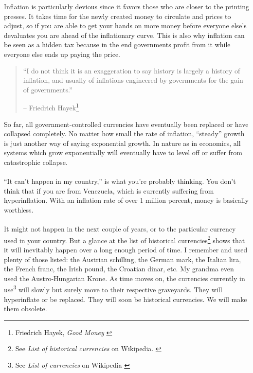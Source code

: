 Inflation is particularly devious since it favors those who are closer
to the printing presses. It takes time for the newly created money to
circulate and prices to adjust, so if you are able to get your hands on
more money before everyone else's devaluates you are ahead of the
inflationary curve. This is also why inflation can be seen as a hidden
tax because in the end governments profit from it while everyone else
ends up paying the price.

\begin{quotation}\begin{samepage}
\enquote{I do not think it is an exaggeration to say history is largely a
history of inflation, and usually of inflations engineered by
governments for the gain of governments.}
\begin{flushright} -- Friedrich Hayek\footnote{Friedrich Hayek, \textit{Good Money} \cite{hayek-good-money}}
\end{flushright}\end{samepage}\end{quotation}

\newpage

So far, all government-controlled currencies have eventually been
replaced or have collapsed completely. No matter how small the rate of
inflation, \enquote{steady} growth is just another way of saying exponential
growth. In nature as in economics, all systems which grow exponentially
will eventually have to level off or suffer from catastrophic collapse.

\paragraph{}
\enquote{It can't happen in my country,} is what you're probably thinking. You don't
think that if you are from Venezuela, which is currently suffering from
hyperinflation. With an inflation rate of over 1 million percent, money is
basically worthless. \cite{wiki:venezuela}

\paragraph{}
It might not happen in the next couple of years, or to the particular currency
used in your country. But a glance at the list of historical
currencies\footnote{See \textit{List of historical currencies} on Wikipedia.
\cite{wiki:historical-currencies}} shows that it will inevitably happen over a
long enough period of time. I remember and used plenty of those listed: the
Austrian schilling, the German mark, the Italian lira, the French franc, the
Irish pound, the Croatian dinar, etc. My grandma even used the Austro-Hungarian
Krone. As time moves on, the currencies currently in use\footnote{See
\textit{List of currencies} on Wikipedia \cite{wiki:list-of-currencies}} will
slowly but surely move to their respective graveyards. They will hyperinflate or
be replaced. They will soon be historical currencies. We will make them
obsolete.

